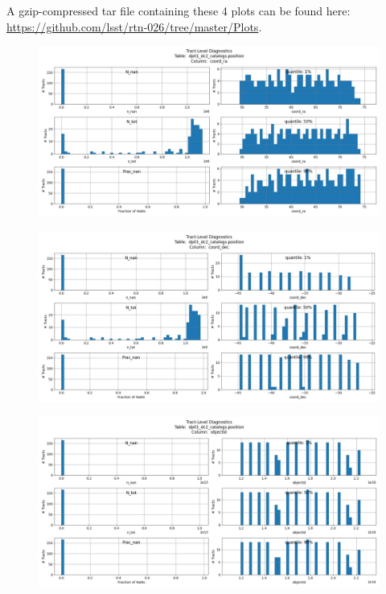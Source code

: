 \documentclass[DM,authoryear,toc]{lsstdoc}
\begin{document}
A gzip-compressed tar file containing these 4 plots can be found here:
\url{https://github.com/lsst/rtn-026/tree/master/Plots}.

\begin{figure}[h]
\centering
\includegraphics[width=1.0\linewidth]{Plots/position_coord_ra.pdf}
\caption{}
\label{fig:position_coord_ra}
\end{figure}

\begin{figure}[h]
\centering
\includegraphics[width=1.0\linewidth]{Plots/position_coord_dec.pdf}
\caption{}
\label{fig:position_coord_dec}
\end{figure}

\begin{figure}[h]
\centering
\includegraphics[width=1.0\linewidth]{Plots/position_objectId.pdf}
\caption{}
\label{fig:position_objectId}
\end{figure}
\end{document}
